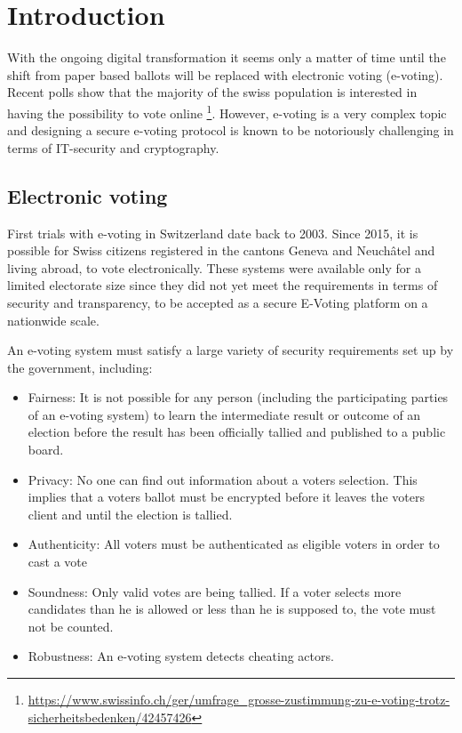 \chapter{Introduction}
With the ongoing digital transformation it seems only a matter of time until the shift from paper based ballots will be replaced with electronic voting (e-voting). Recent polls show that the majority of the swiss population is interested in having the possibility to vote online \footnote{\url{https://www.swissinfo.ch/ger/umfrage_grosse-zustimmung-zu-e-voting-trotz-sicherheitsbedenken/42457426}}. However, e-voting is a very complex topic and designing a secure e-voting protocol is known to be notoriously challenging in terms of IT-security and cryptography. 

\section{Electronic voting}
First trials with e-voting in Switzerland date back to 2003. Since 2015, it is possible for Swiss citizens registered in the cantons Geneva and Neuchâtel and living abroad, to vote electronically. These systems were available only for a limited electorate size since they did not yet meet the requirements in terms of security and transparency, to be accepted as a secure E-Voting platform on a nationwide scale.

An e-voting system must satisfy a large variety of security requirements set up by the government, including:

\begin{itemize}
	\item Fairness: It is not possible for any person (including the participating parties of an e-voting system) to learn the intermediate result or outcome of an election before the result has been officially tallied and published to a public board.  
	\item Privacy: No one can find out information about a voters selection. This implies that a voters ballot must be encrypted before it leaves the voters client and until the election is tallied.
	\item Authenticity: All voters must be authenticated as eligible voters in order to cast a vote
	\item Soundness: Only valid votes are being tallied. If a voter selects more candidates than he is allowed or less than he is supposed to, the vote must not be counted.
 \item Robustness: An e-voting system detects cheating actors.
\end{itemize}

